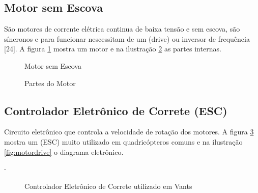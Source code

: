 \subsection{Motor sem Escova}
São motores de corrente elétrica continua de baixa tensão e sem escova, são síncronos e para funcionar nescessitam de um (drive) ou inversor de frequência [24]. A figura \ref{fig:motor} mostra um motor e na ilustração \ref{fig:motorpart} as partes internas.
%
\begin{figure}[H]
	\centering
	\caption{Motor sem Escova}
	\fontsize{9pt}{12pt}\selectfont
	\def\svgwidth{13cm}
	
	\label{fig:motor}
\end{figure}


\begin{figure}[H]
	\centering
	\caption{Partes do Motor}
	\fontsize{9pt}{12pt}\selectfont
	\def\svgwidth{13cm}
	
	\label{fig:motorpart}
\end{figure}

\subsection{Controlador Eletrônico de Correte (ESC)}
Circuito eletrônico que controla a velocidade de rotação dos motores. A figura \ref{fig:esc} mostra um (ESC) muito utilizado em quadricópteros comuns e na ilustração \ref{fig:motordrive} o diagrama eletrônico.

-
\begin{figure}[H]
	\centering
	\caption{Controlador Eletrônico de Correte utilizado em Vants}
	\fontsize{9pt}{12pt}\selectfont
	\def\svgwidth{13cm}
	
	\label{fig:esc}
\end{figure}


